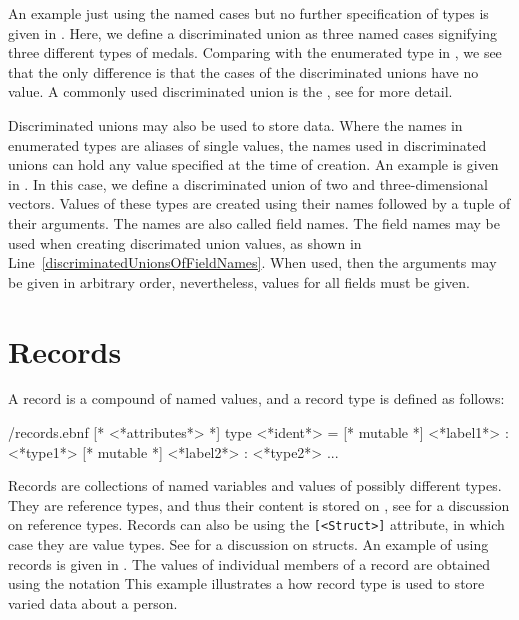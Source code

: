 \documentclass[fsharpNotes.tex]{subfiles}
\begin{document}
An example just using the named cases but no further specification of types is given in .
%
%
Here, we define a discriminated union as three named cases signifying three different types of medals. Comparing with the enumerated type in , we see that the only difference is that the cases of the discriminated unions have no value. A commonly used discriminated union is the , see  for more detail.

Discriminated unions may also be used to store data. Where the names in enumerated types are aliases of single values, the names used in discriminated unions can hold any value specified at the time of creation. An example is given in .
%
%
In this case, we define a discriminated union of two and three-dimensional vectors. Values of these types are created using their names followed by a tuple of their arguments. The names are also called field names. The field names may be used when creating discrimated union values, as shown in Line~\ref{discriminatedUnionsOfFieldNames}. When used, then the arguments may be given in arbitrary order, nevertheless, values for all fields must be given.

\section{Records}
\label{sec:records}
A record is a compound of named values, and a record type is defined as follows:
%
\begin{verbatimwrite}{\ebnf/records.ebnf}
[* <*attributes*> *] 
type <*ident*> = {
  [* mutable *] <*label1*> : <*type1*>
  [* mutable *] <*label2*> : <*type2*>
  ...
}
\end{verbatimwrite}
%
Records are collections of named variables and values of possibly different types. They are reference types, and thus their content is stored on , see  for a discussion on reference types. Records can also be  using the \lstinline{[<Struct>]} attribute, in which case they are value types. See  for a discussion on structs. An example of using records is given in . The values of individual members of a record are obtained using the  notation
%
%
This example illustrates a how record type is used to store varied data about a person.
\end{document}
